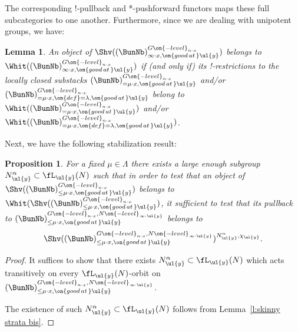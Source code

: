 \documentclass[9pt]{amsart}
\newtheorem{lem}[subsubsection]{Lemma}
\newtheorem{prop}[subsubsection]{Proposition}
\theoremstyle{definition}
\theoremstyle{remark}
\newcommand{\lemref}[1]{Lemma~\ref{#1}}
\numberwithin{equation}{section}
\begin{document}
\medskip

The corresponding !-pullback and *-pushforward functors maps these full subcategories to one another.
Furthermore, since we are dealing with unipotent groups, we have:

\begin{lem} \label{l:Whit via strata y}
An object of $\Shv((\BunNb)_{\infty\cdot x,\on{good\,at\,}\ul{y}}^{G\on{-level}_{n\cdot x}})$ belongs to
$\Whit((\BunNb)_{\infty\cdot x,\on{good\,at\,}\ul{y}}^{G\on{-level}_{n\cdot x}})$ if (and only if) its !-restrictions to
the locally closed substacks $(\BunNb)_{=\mu\cdot x,\on{good\,at\,}\ul{y}}^{G\on{-level}_{n\cdot x}}$
and/or $(\BunNb)_{=\mu\cdot x,\on{def}=\lambda,\on{good\,at\,}\ul{y}}^{G\on{-level}_{n\cdot x}}$
belong to  $\Whit((\BunNb)_{=\mu\cdot x,\on{good\,at\,}\ul{y}}^{G\on{-level}_{n\cdot x}})$
and/or $\Whit((\BunNb)_{=\mu\cdot x,\on{def}=\lambda,\on{good\,at\,}\ul{y}}^{G\on{-level}_{n\cdot x}})$.
\end{lem}

\sssec{}

Next, we have the following stabilization result:

\begin{prop} \label{p:alpha is enough}
For a fixed $\mu\in \Lambda$ there exists a large enough subgroup $N^\alpha_{\ul{y}}\subset \fL_{\ul{y}}(N)$ such that in order to test
that an object of $\Shv((\BunNb)_{\leq \mu\cdot x,\on{good\,at\,}\ul{y}}^{G\on{-level}_{n\cdot x}})$ belongs to 
$\Whit(\Shv((\BunNb)_{\leq \mu\cdot x,\on{good\,at\,}\ul{y}}^{G\on{-level}_{n\cdot x}})$, it sufficient to test that 
its pullback
to $(\BunNb)^{G\on{-level}_{n\cdot x},N\on{-level}_{\infty\cdot \ul{y}}}_{\leq \mu\cdot x,\on{good\,at\,}\ul{y}}$ belongs to
$$\Shv((\BunNb)^{G\on{-level}_{n\cdot x},N\on{-level}_{\infty\cdot \ul{y}}}_{\leq \mu\cdot x,\on{good\,at\,}\ul{y}})^{N^\alpha_{\ul{y}},\chi_{\ul{y}}}.$$
\end{prop}

\begin{proof}

It suffices to show that there exists $N^\alpha_{\ul{y}}\subset \fL_{\ul{y}}(N)$ which acts transitively on every 
$\fL_{\ul{y}}(N)$-orbit on $(\BunNb)^{G\on{-level}_{n\cdot x},N\on{-level}_{\infty\cdot \ul{y}}}_{\leq \mu\cdot x,\on{good\,at\,}\ul{y}}$.

\medskip

The existence of such $N^\alpha_{\ul{y}}\subset \fL_{\ul{y}}(N)$ follows from \lemref{l:skinny strata bis}. 

\end{proof}
\end{document}
